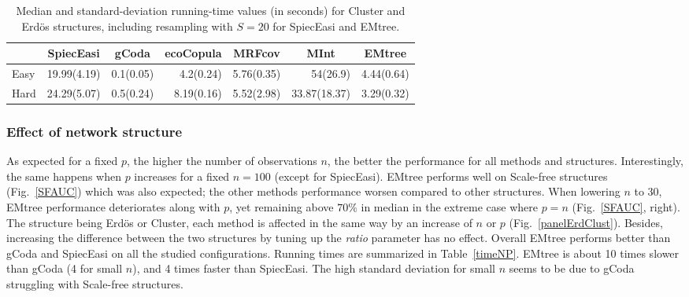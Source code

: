 \begin{table}
\centering
 
\begin{tabular}{l|rrrrrr}
 & \multicolumn{1}{c}{SpiecEasi} & \multicolumn{1}{c}{gCoda} & \multicolumn{1}{c}{ecoCopula} & \multicolumn{1}{c}{MRFcov} & \multicolumn{1}{c}{MInt} & \multicolumn{1}{c}{EMtree} \\ 
  \hline
Easy &  19.99(4.19) & 0.1(0.05) & 4.2(0.24) & 5.76(0.35) & 54(26.9) & 4.44(0.64) \\ 
  Hard &  24.29(5.07) & 0.5(0.24) & 8.19(0.16) & 5.52(2.98) & 33.87(18.37) & 3.29(0.32)  \\ 
   \hline
\end{tabular}
\caption{Median and standard-deviation running-time values (in seconds) for Cluster and Erdös structures, including resampling with $S=20$ for SpiecEasi and EMtree.}
\label{timesTPFN}
\end{table}





\subsubsection{Effect of network structure}

As expected for a fixed $p$, the higher the number of observations $n$, the better the performance for all methods and structures. Interestingly, the same happens when $p$ increases for a fixed $n=100$ (except for SpiecEasi).
EMtree performs well on Scale-free structures (Fig.~\ref{SFAUC}) which was also expected; the other methods performance worsen compared to other structures. When lowering $n$ to 30, EMtree performance deteriorates along with $p$, yet remaining above $70\%$ in median in the extreme case where $p=n$ (Fig.~\ref{SFAUC}, right). The structure being Erdös or Cluster, each method is affected in the same way by an increase of $n$ or $p$ (Fig.~\ref{panelErdClust}). Besides, increasing the difference between the two structures by tuning up the \textit{ratio} parameter has no effect. Overall EMtree performs better than gCoda and SpiecEasi on all the studied configurations. Running times are summarized in Table~\ref{timeNP}. EMtree is about 10 times slower than gCoda (4 for small $n$), and 4 times faster than SpiecEasi. The high standard deviation for small $n$ seems to be due to gCoda struggling with Scale-free structures.
  

